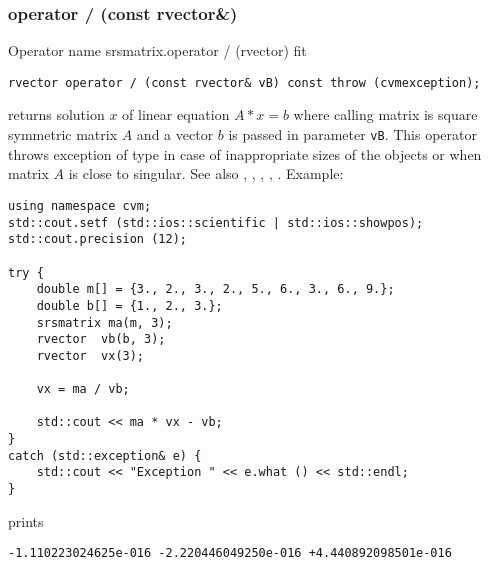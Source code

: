 \subsubsection{operator / (const rvector\&)}
Operator%
\pdfdest name {srsmatrix.operator / (rvector)} fit
\begin{verbatim}
rvector operator / (const rvector& vB) const throw (cvmexception);
\end{verbatim}
returns solution $x$ of linear equation
$A*x=b$ where calling matrix is square symmetric matrix $A$
and a vector $b$ is passed in parameter \verb"vB".
This operator throws exception 
of type 
in case of inappropriate sizes
of the objects or when  matrix $A$ is close to singular.
See also , 
, 
, 
, .
Example:
\begin{Verbatim}
using namespace cvm;
std::cout.setf (std::ios::scientific | std::ios::showpos);
std::cout.precision (12);

try {
    double m[] = {3., 2., 3., 2., 5., 6., 3., 6., 9.};
    double b[] = {1., 2., 3.};
    srsmatrix ma(m, 3);
    rvector  vb(b, 3);
    rvector  vx(3);

    vx = ma / vb;

    std::cout << ma * vx - vb;
}
catch (std::exception& e) {
    std::cout << "Exception " << e.what () << std::endl;
}
\end{Verbatim}
prints
\begin{Verbatim}
-1.110223024625e-016 -2.220446049250e-016 +4.440892098501e-016
\end{Verbatim}
\newpage






